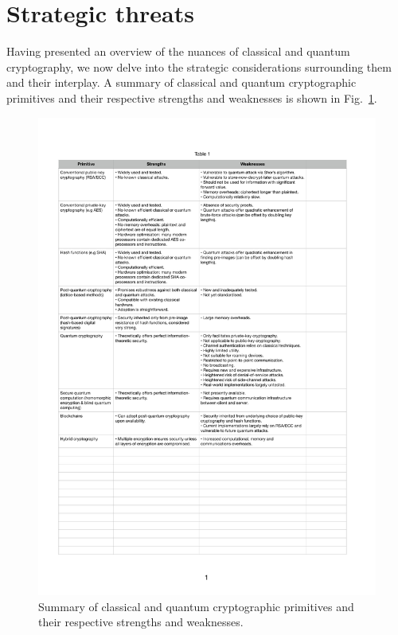 \section{Strategic threats} \label{strategic-threats}

Having presented an overview of the nuances of classical and quantum cryptography, we now delve into the strategic considerations surrounding them and their interplay. A summary of classical and quantum cryptographic primitives and their respective strengths and weaknesses is shown in Fig.~\ref{fig:pros_and_cons}.

\begin{figure}
\includegraphics[width=\linewidth]{figures/pros_and_cons}
\caption{Summary of classical and quantum cryptographic primitives and their respective strengths and weaknesses.} \label{fig:pros_and_cons}
\end{figure}


